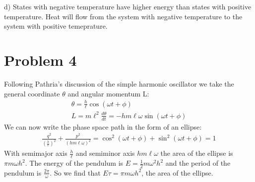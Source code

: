 \documentclass[a4paper,11pt]{article}
\numberwithin{equation}{section}
\begin{document}
d) States with negative temperature have higher energy than states with positive temperature. 
Heat will flow from the system with negative temperature to the system with positive temeprature.

\section{Problem 4}
Following Pathria's discussion of the simple harmonic oscillator we take the general coordinate $\theta$ and angular momentum L:
\begin{gather}
 \theta=\frac{h}{\ell}\cos{(\omega t+\phi)}\\
 L=m\ell^2\frac{d\theta}{dt}=-hm\ell\omega\sin{(\omega t+\phi)}
\end{gather}
We can now write the phase space path in the form of an ellipse:
\begin{gather}
 \frac{q^2}{(\frac{h}{\ell})^2}+\frac{p^2}{(hm\ell\omega)^2}=
 \cos^2{(\omega t+\phi)}+\sin^2{(\omega t+\phi)}=1
\end{gather}
With semimajor axis $\frac{h}{\ell}$ and semiminor axis $hm\ell\omega$ the area of the ellipse is $\pi m\omega h^2$.
The energy of the pendulum is $E=\frac{1}{2}m\omega^2h^2$ and the period of the pendulum is $\frac{2\pi}{\omega}$.
So we find that $E\tau = \pi m\omega h^2$, the area of the ellipse.
\end{document}
